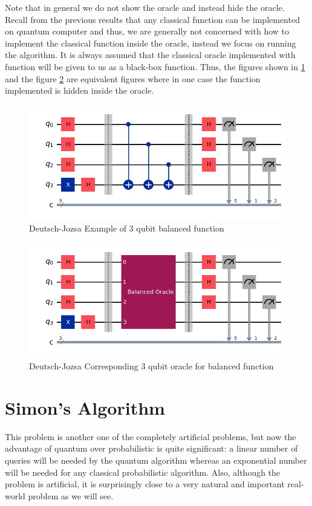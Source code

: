\documentclass[12pt, oneside]{book}
\theoremstyle{definition}
\theoremstyle{definition}
\theoremstyle{remark}
\begin{document}
\begin{enumerate}
    Note that in general we do not show the oracle and instead hide the oracle. Recall from the previous results that any classical function can be implemented on quantum computer and thus, we are generally not concerned with how to implement the classical function inside the oracle, instead we focus on running the algorithm. It is always assumed that the classical oracle implemented with function will be given to us as a black-box function. Thus, the figures shown in \ref{fig:deutsch_3q_example} and the figure \ref{fig:deutsch_3q_oracle} are equivalent figures where in one case the function implemented is hidden inside the oracle.
\begin{figure}
    \centering
    \includegraphics[width=0.5\linewidth]{../images/deutsch_3q_example.png}
    \caption{Deutsch-Jozsa Example of 3 qubit balanced function}
    \label{fig:deutsch_3q_example}
\end{figure}
\begin{figure}[H]
    \centering
    \includegraphics[width=0.5\linewidth]{../images/deutsch_3q_oracle.png}
    \caption{Deutsch-Jozsa Corresponding 3 qubit oracle for balanced function}
    \label{fig:deutsch_3q_oracle}
\end{figure}
\end{enumerate}

\chapter{Simon's Algorithm}
This problem is another one of the completely artificial problems, but now the advantage of quantum over probabilistic is quite significant: a linear  number of queries will be needed by the quantum algorithm whereas an exponential number will be needed for any classical probabilistic algorithm. Also, although the problem is artificial, it is surprisingly close to a very natural and important real-world problem as we will see.
\end{document}
